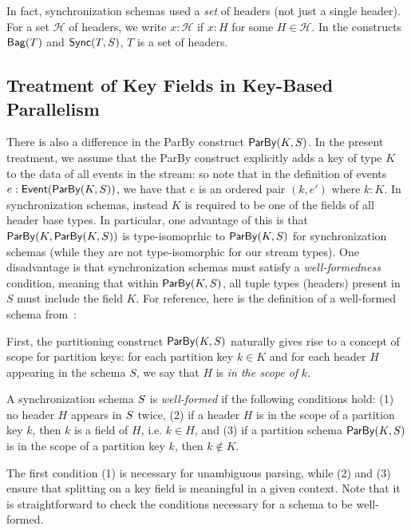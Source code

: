 In fact, synchronization schemas used a \emph{set} of headers (not just a single header).
For a set $\mathcal{H}$ of headers, we write
$x: \mathcal{H}$ if $x : H$ for some $H \in \mathcal{H}$.
In the constructs $\relleaf{T}$ and $\hier{T}{S}$,
$T$ is a set of headers.

\subsection{Treatment of Key Fields in Key-Based Parallelism}

There is also a difference in the ParBy construct $\keyby{K}{S}$.
In the present treatment, we assume that the ParBy construct explicitly adds a key of type $K$ to the data of all events in the stream: so note that in the definition of events $\eventtype{e}{\keyby{K}{S}}$, we have that $e$ is an ordered pair $(k, e')$
where $k: K$.
In synchronization schemas, instead $K$ is required to be one of the fields of all header base types.
In particular, one advantage of this is that $\keyby{K}{\keyby{K}{S}}$ is type-isomoprhic to $\keyby{K}{S}$ for synchronization schemas (while they are not type-isomorphic for our stream types).
One disadvantage is that synchronization schemas must satisfy a \emph{well-formedness} condition, meaning that within $\keyby{K}{S}$, all tuple types (headers) present in $S$ must include the field $K$.
For reference, here is the definition of a well-formed schema from~:

\begin{definition}
\label{45:def:well-formed-sync-schema}
First, the partitioning construct $\keyby{K}{S}$ naturally gives rise to a concept of
scope for partition keys: for each partition key $k \in K$ and for each
header $H$ appearing in the schema $S$,
we say that $H$ is \emph{in the scope of} $k$.

A synchronization schema $\ss$ is \emph{well-formed} if the following conditions hold: (1) no header $H$ appears in $\ss$ twice,
    (2) if a header $H$ is in the scope of a partition key $k$, then $k$ is a field of $H$, i.e. $k \in H$, and
    (3) if a partition schema $\keyby{K}{S}$ is in the scope of a partition key $k$, then $k \not \in K$.
\end{definition}

The first condition (1) is necessary for unambiguous parsing, while (2) and (3)
ensure that splitting on a key field is meaningful in a given context.
Note that it is straightforward to check the conditions necessary for a schema to be well-formed.

